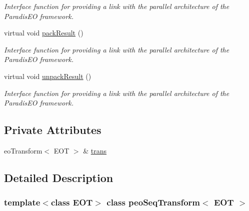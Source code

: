\begin{CompactItemize}
\begin{CompactList}\small\item\em Interface function for providing a link with the parallel architecture of the Paradis\-EO framework. \item\end{CompactList}\item 
\hypertarget{classpeoSeqTransform_4861c61f9e46d83964ea8a156a9a3ee0}{
virtual void \hyperlink{classpeoSeqTransform_4861c61f9e46d83964ea8a156a9a3ee0}{pack\-Result} ()}
\label{classpeoSeqTransform_4861c61f9e46d83964ea8a156a9a3ee0}

\begin{CompactList}\small\item\em Interface function for providing a link with the parallel architecture of the Paradis\-EO framework. \item\end{CompactList}\item 
\hypertarget{classpeoSeqTransform_5dd029fc011eb2a810ca1140025129b1}{
virtual void \hyperlink{classpeoSeqTransform_5dd029fc011eb2a810ca1140025129b1}{unpack\-Result} ()}
\label{classpeoSeqTransform_5dd029fc011eb2a810ca1140025129b1}

\begin{CompactList}\small\item\em Interface function for providing a link with the parallel architecture of the Paradis\-EO framework. \item\end{CompactList}\end{CompactItemize}
\subsection*{Private Attributes}
\begin{CompactItemize}
\item 
\hypertarget{classpeoSeqTransform_ad3e16c59dd6c46dfc1baf7b88af30cf}{
eo\-Transform$<$ EOT $>$ \& \hyperlink{classpeoSeqTransform_ad3e16c59dd6c46dfc1baf7b88af30cf}{trans}}
\label{classpeoSeqTransform_ad3e16c59dd6c46dfc1baf7b88af30cf}

\end{CompactItemize}


\subsection{Detailed Description}
\subsubsection*{template$<$class EOT$>$ class peo\-Seq\-Transform$<$ EOT $>$}


